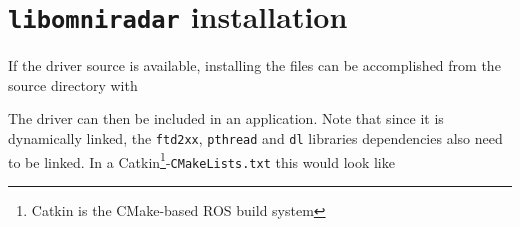 \chapter{\texttt{libomniradar} installation} \label{install}

If the driver source is available, installing the files can be
accomplished from the source directory with

\begin{Shaded}
\begin{Highlighting}[]
\KeywordTok{\&\&} 
\end{Highlighting}
\end{Shaded}

The driver can then be included in an application. Note that since it is
dynamically linked, the \texttt{ftd2xx}, \texttt{pthread} and
\texttt{dl} libraries dependencies also need to be linked. In a Catkin\footnote{Catkin is the CMake-based ROS build system}-\texttt{CMakeLists.txt}
this would look like

\begin{Shaded}
\begin{Highlighting}[]
\NormalTok{(}
\NormalTok{)}
\end{Highlighting}
\end{Shaded}